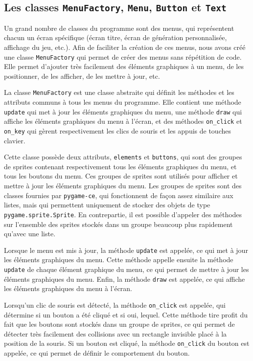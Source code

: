 \documentclass[12pt]{scrreprt} %
\begin{document}
\subsection{Les classes \texttt{MenuFactory}, \texttt{Menu}, \texttt{Button} et \texttt{Text}}

Un grand nombre de classes du programme sont des menus, qui représentent chacun un écran spécifique (écran titre, écran de génération personnalisée, affichage du jeu, etc.). Afin de faciliter la création de ces menus, nous avons créé une classe \texttt{MenuFactory} qui permet de créer des menus sans répétition de code. Elle permet d'ajouter très facilement des éléments graphiques à un menu, de les positionner, de les afficher, de les mettre à jour, etc.


La classe \texttt{MenuFactory} est une classe abstraite qui définit les méthodes et les attributs communs à tous les menus du programme. Elle contient une méthode \texttt{update} qui met à jour les éléments graphiques du menu, une méthode \texttt{draw} qui affiche les éléments graphiques du menu à l'écran, et des méthodes \texttt{on\_click} et \texttt{on\_key} qui gèrent respectivement les clics de souris et les appuis de touches clavier.

Cette classe possède deux attributs, \texttt{elements} et \texttt{buttons}, qui sont des groupes de sprites contenant respectivement tous les éléments graphiques du menu, et tous les boutons du menu. Ces groupes de sprites sont utilisés pour afficher et mettre à jour les éléments graphiques du menu. Les groupes de sprites sont des classes fournies par \texttt{pygame-ce}, qui fonctionnent de façon assez similaire aux listes, mais qui permettent uniquement de stocker des objets de type \texttt{pygame.sprite.Sprite}. En contrepartie, il est possible d'appeler des méthodes sur l'ensemble des sprites stockés dans un groupe beaucoup plus rapidement qu'avec une liste.

Lorsque le menu est mis à jour, la méthode \texttt{update} est appelée, ce qui met à jour les éléments graphiques du menu. Cette méthode appelle ensuite la méthode \texttt{update} de chaque élément graphique du menu, ce qui permet de mettre à jour les éléments graphiques du menu. Enfin, la méthode \texttt{draw} est appelée, ce qui affiche les éléments graphiques du menu à l'écran.

Lorsqu'un clic de souris est détecté, la méthode \texttt{on\_click} est appelée, qui détermine si un bouton a été cliqué et si oui, lequel. Cette méthode tire profit du fait que les boutons sont stockés dans un groupe de sprites, ce qui permet de détecter très facilement des collisions avec un rectangle invisible placé à la position de la souris. Si un bouton est cliqué, la méthode \texttt{on\_click} du bouton est appelée, ce qui permet de définir le comportement du bouton.
\end{document}
